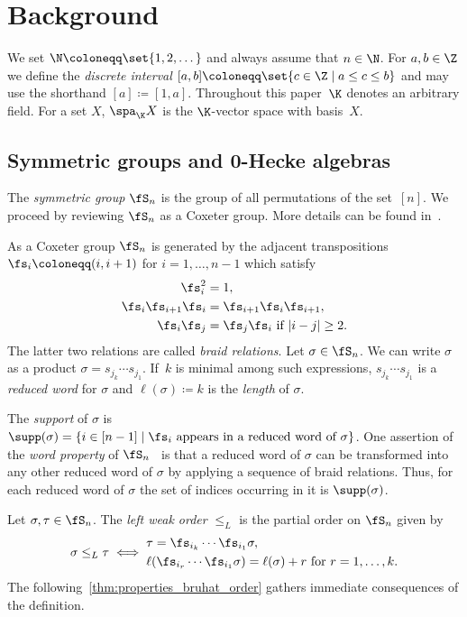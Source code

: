 \section{Background}
\label{sec:preliminaries}

We set $\N \coloneqq \set{1,2,\dots}$ and always assume that $n\in \N$. For $a,b\in \Z$ we define the \emph{discrete interval} $[a,b]\coloneqq \set{c\in \Z\mid a\leq c \leq b}$ and may use the shorthand $[a] \coloneqq [1,a]$. 
Throughout this paper~$\K$ denotes an arbitrary field. For a set $X$, $\spa_\K X$ is the $\K$-vector space with basis~$X$.

\subsection{Symmetric groups and 0-Hecke algebras}

The \emph{symmetric group} $\fS_n$ is the group of all permutations of the set~$[n]$. We proceed by reviewing $\fS_n$ as a Coxeter group. More details can be found in~\cite{Bjorner2006}.

As a Coxeter group $\fS_n$ is generated by the adjacent transpositions $\fs_i \coloneqq (i,i+1)$ for $i= 1,\dots, n-1$ which satisfy
\begin{alignat*}{3}
\fs_i^2 &= 1, 			\\
\fs_i\fs_{i+1}\fs_i &= \fs_{i+1}\fs_i\fs_{i+1}, 	\\
\fs_i\fs_j &= \fs_j \fs_i 		\ \text{if } |i-j|\geq 2. 
\end{alignat*}
The latter two relations are called \emph{braid relations}.
Let $\sigma \in \fS_n$. We can write $\sigma$ as a product $\sigma = s_{j_k} \cdots s_{j_1}$.
If~$k$ is minimal among such expressions, $s_{j_k} \cdots s_{j_1}$ is a \emph{reduced word} for $\sigma$ and $\ell(\sigma) \coloneqq k$ is the \emph{length} of $\sigma$. 

The \emph{support} of $\sigma$ is $\supp(\sigma) =\{ i\in [n-1] \mid \text{$\fs_i$ appears in a reduced word of $\sigma$}\}$.
One assertion of the \emph{word property} of $\fS_n$~\cite[Theorem~3.3.1]{Bjorner2006} is that a reduced word of $\sigma$ can be transformed into any other reduced word of $\sigma$ by applying a sequence of braid relations. 
Thus, for each reduced word of $\sigma$ the set of indices occurring in it is $\supp(\sigma)$.

Let $\sigma,\tau \in \fS_n$. The \emph{left weak order} $\leq_L$ is the partial order on $\fS_n$ given by
\begin{equation*}
\sigma \leq_L \tau \iff 
\begin{aligned}
&\tau = \fs_{i_k} \cdots \fs_{i_1} \sigma, \\
&\ell(\fs_{i_r} \cdots \fs_{i_1} \sigma) = \ell(\sigma) + r \text{ for } r=1,\dots ,k.
\end{aligned}
\end{equation*}
The following~\cref{thm:properties_bruhat_order} gathers immediate consequences of the definition.

